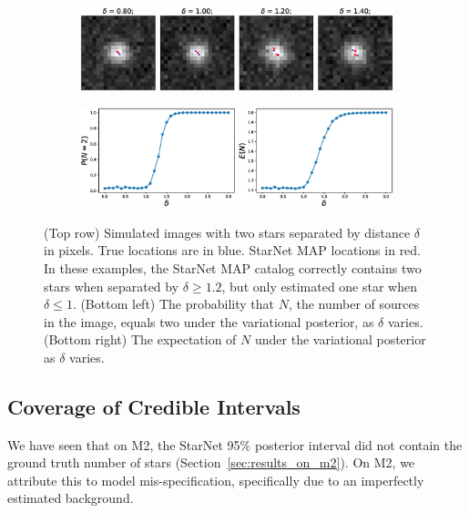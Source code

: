\begin{figure}[tb]
    \centering
    \begin{subfigure}{0.8\textwidth}
        \includegraphics[width=\textwidth]{figures_vg/deblending/example_deblending.eps}
    \end{subfigure}
    \begin{subfigure}{0.8\textwidth}
        \includegraphics[width=\textwidth]{figures_vg/deblending/summary_statistics.eps}
    \end{subfigure}
    \caption{(Top row) Simulated images with two stars separated by distance $\delta$ in pixels.
    True locations are in blue. StarNet MAP locations in red. 
    In these examples, the StarNet MAP catalog correctly contains two stars when separated by $\delta \geq 1.2$,
    but only estimated one star when $\delta \leq 1$.
    (Bottom left) The probability that $N$, the number of sources in the image, equals two
    under the variational posterior, as $\delta$ varies.
    (Bottom right) The expectation of $N$ under the variational posterior as $\delta$ varies. }
    \label{fig:deblending_fig}
\end{figure}

\subsection{Coverage of Credible Intervals}
\label{sec:coverage}

We have seen that on M2, the StarNet 95\% posterior interval did not contain the ground truth number of stars (Section~\ref{sec:results_on_m2}).
On M2, we attribute this to model mis-specification, specifically due to an imperfectly
estimated background.

